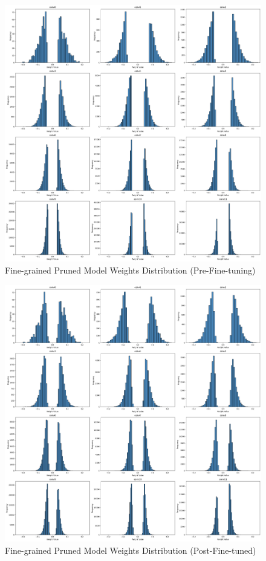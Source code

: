 \documentclass[12pt]{article}
\begin{document}
\begin{figure}[h]
  \centering
  \includegraphics[width=1\linewidth]{report_images/fine_dist_pp.png}
  \caption{\label{fig:fine_dist_pp}Fine-grained Pruned Model Weights Distribution (Pre-Fine-tuning)}
\end{figure}
\FloatBarrier

\begin{figure}[h]
  \centering
  \includegraphics[width=1\linewidth]{report_images/fine_dist_ft.png}
  \caption{\label{fig:fine_dist_ft}Fine-grained Pruned Model Weights Distribution (Post-Fine-tuned)}
\end{figure}
\FloatBarrier
\end{document}
